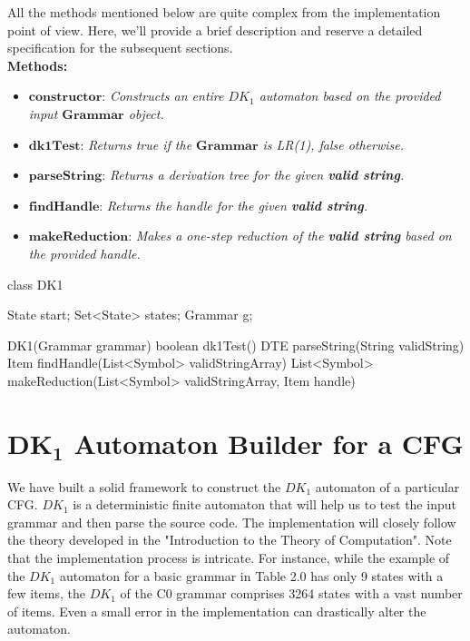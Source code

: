 All the methods mentioned below are quite complex from the implementation point of view. Here, we'll provide a brief description and reserve a detailed specification for the subsequent sections.\\

\textbf{Methods:}
\begin{itemize}
    \item \(\boldsymbol{constructor}\): \textit{Constructs an entire \(DK_{1}\) automaton based on the provided input \(\boldsymbol{Grammar}\) object.}
    \item \(\boldsymbol{dk1Test}\): \textit{Returns true if the \(\boldsymbol{Grammar}\) is LR(1), false otherwise.}
    \item \(\boldsymbol{parseString}\): \textit{Returns a derivation tree for the given \textbf{valid string}.}
    \item \(\boldsymbol{findHandle}\): \textit{Returns the handle for the given \textbf{valid string}.}
    \item \(\boldsymbol{makeReduction}\): \textit{Makes a one-step reduction of the \textbf{valid string} based on the provided handle.}
\end{itemize}

\begin{codeblock}[DK1 Class]
    class DK1 {
        State start;
        Set<State> states;
        Grammar g;

        DK1(Grammar grammar) {}
        boolean dk1Test() {}
        DTE parseString(String validString) {}
        Item findHandle(List<Symbol> validStringArray) {}
        List<Symbol> makeReduction(List<Symbol> validStringArray, Item handle) {}
    }
\end{codeblock}

\newpage


\section{\(\boldsymbol{DK_{1}}\) Automaton Builder for a CFG}\label{sec:DK1 Automaton Builder for a CFG}

We have built a solid framework to construct the \(DK_{1}\) automaton of a particular CFG. \(DK_{1}\) is a deterministic finite automaton that will help us to test the input grammar and then parse the source code. The implementation will closely follow the theory developed in the "Introduction to the Theory of Computation". Note that the implementation process is intricate. For instance, while the example of the \(DK_{1}\) automaton for a basic grammar in Table 2.0 has only 9 states with a few items, the \(DK_{1}\) of the C0 grammar comprises 3264 states with a vast number of items. Even a small error in the implementation can drastically alter the automaton.

